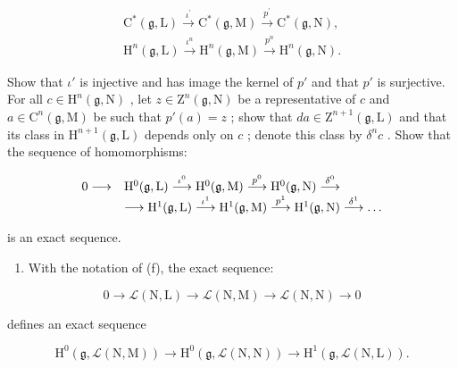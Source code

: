 \[
\begin{array}{l} \mathrm{C} ^ {*} (\mathfrak {g}, \mathrm{L}) \xrightarrow {\iota^ {\prime}} \mathrm{C} ^ {*} (\mathfrak {g}, \mathrm{M}) \xrightarrow {p ^ {\prime}} \mathrm{C} ^ {*} (\mathfrak {g}, \mathrm{N}), \\ \mathrm{H} ^ {n} (\mathfrak {g}, \mathrm{L}) \xrightarrow {\iota^ {n}} \mathrm{H} ^ {n} (\mathfrak {g}, \mathrm{M}) \xrightarrow {p ^ {n}} \mathrm{H} ^ {n} (\mathfrak {g}, \mathrm{N}). \end{array}
\]

Show that \(\iota'\) is injective and has image the kernel of \(p'\) and that \(p'\) is surjective. For all \(c \in \mathrm{H}^n(\mathfrak{g},\mathrm{N})\) , let \(z \in \mathrm{Z}^n(\mathfrak{g},\mathrm{N})\) be a representative of \(c\) and \(a \in \mathrm{C}^n(\mathfrak{g},\mathrm{M})\) be such that \(p'(a) = z\) ; show that \(da \in \mathrm{Z}^{n+1}(\mathfrak{g},\mathrm{L})\) and that its class in \(\mathrm{H}^{n+1}(\mathfrak{g},\mathrm{L})\) depends only on \(c\) ; denote this class by \(\delta^n c\) . Show that the sequence of homomorphisms:

\[
\begin{array}{r l} 0 \longrightarrow & \mathrm{H} ^ {0} (\mathfrak {g}, \mathrm{L}) \stackrel {{\iota ^ {0}}} {{\longrightarrow}} \mathrm{H} ^ {0} (\mathfrak {g}, \mathrm{M}) \stackrel {{p ^ {0}}} {{\longrightarrow}} \mathrm{H} ^ {0} (\mathfrak {g}, \mathrm{N}) \stackrel {{\delta^ {0}}} {{\longrightarrow}} \\ & \longrightarrow \mathrm{H} ^ {1} (\mathfrak {g}, \mathrm{L}) \stackrel {{\iota ^ {1}}} {{\longrightarrow}} \mathrm{H} ^ {1} (\mathfrak {g}, \mathrm{M}) \stackrel {{p ^ {1}}} {{\longrightarrow}} \mathrm{H} ^ {1} (\mathfrak {g}, \mathrm{N}) \stackrel {{\delta^ {1}}} {{\longrightarrow}} \dots \end{array}
\]

is an exact sequence.

\begin{enumerate}
\def\labelenumi{(\alph{enumi})}
\setcounter{enumi}{6}
\tightlist
\item
  With the notation of (f), the exact sequence:
\end{enumerate}

\[
0 \to \mathscr {L} (\mathrm{N}, \mathrm{L}) \to \mathscr {L} (\mathrm{N}, \mathrm{M}) \to \mathscr {L} (\mathrm{N}, \mathrm{N}) \to 0
\]

defines an exact sequence

\[
\mathrm{H} ^ {0} (\mathfrak {g}, \mathscr {L} (\mathrm{N}, \mathrm{M})) \rightarrow \mathrm{H} ^ {0} (\mathfrak {g}, \mathscr {L} (\mathrm{N}, \mathrm{N})) \rightarrow \mathrm{H} ^ {1} (\mathfrak {g}, \mathscr {L} (\mathrm{N}, \mathrm{L})).
\]

